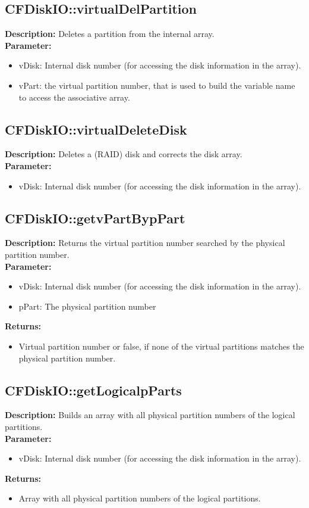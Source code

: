 \subsection{CFDiskIO::virtualDelPartition}
\textbf{Description:} Deletes a partition from the internal array.\\
\textbf{Parameter:}
\begin{itemize}
\item vDisk: Internal disk number (for accessing the disk information in the array).
\item vPart: the virtual partition number, that is used to build the variable name to access the associative array.
\end{itemize}

\subsection{CFDiskIO::virtualDeleteDisk}
\textbf{Description:} Deletes a (RAID) disk and corrects the disk array.\\
\textbf{Parameter:}
\begin{itemize}
\item vDisk: Internal disk number (for accessing the disk information in the array).
\end{itemize}

\subsection{CFDiskIO::getvPartBypPart}
\textbf{Description:} Returns the virtual partition number searched by the physical partition number.\\
\textbf{Parameter:}
\begin{itemize}
\item vDisk: Internal disk number (for accessing the disk information in the array).
\item pPart: The physical partition number
\end{itemize}
\textbf{Returns:}
\begin{itemize}
\item Virtual partition number or false, if none of the virtual partitions matches the physical partition number.
\end{itemize}

\subsection{CFDiskIO::getLogicalpParts}
\textbf{Description:} Builds an array with all physical partition numbers of the logical partitions.\\
\textbf{Parameter:}
\begin{itemize}
\item vDisk: Internal disk number (for accessing the disk information in the array).
\end{itemize}
\textbf{Returns:}
\begin{itemize}
\item Array with all physical partition numbers of the logical partitions.
\end{itemize}

